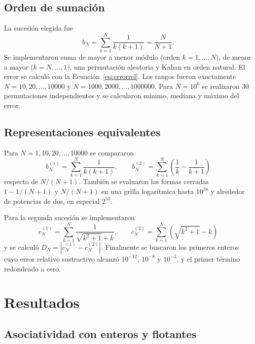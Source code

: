 \documentclass[11pt,a4paper]{article}
\newcommand{\Dabs}{D_N}
\begin{document}
\subsection{Orden de sumación}

La sucesión elegida fue
\begin{equation}
b_N=\sum_{k=1}^{N}\frac{1}{k(k+1)}=\frac{N}{N+1}.
\label{eq:bN}
\end{equation}
Se implementaron suma de mayor a menor módulo (orden $k=1,\ldots,N$), de menor a mayor ($k=N,\ldots,1$), una permutación aleatoria y Kahan en orden natural. El error se calculó con la Ecuación~\ref{eq:errorrel}. Los rangos fueron exactamente $N=10,20,\ldots,10000$ y $N=1000,2000,\ldots,1000000$. Para $N=10^6$ se realizaron 30 permutaciones independientes y se calcularon mínimo, mediana y máximo del error.

\subsection{Representaciones equivalentes}

Para $N=1,10,20,\ldots,10000$ se compararon
\begin{equation}
b_N^{(1)}=\sum_{k=1}^{N}\frac{1}{k(k+1)},
\qquad
b_N^{(2)}=\sum_{k=1}^{N}\left(\frac{1}{k}-\frac{1}{k+1}\right)
\label{eq:brep}
\end{equation}
respecto de $N/(N+1)$. También se evaluaron las formas cerradas $1-1/(N+1)$ y $N/(N+1)$ en una grilla logarítmica hasta $10^{18}$ y alrededor de potencias de dos, en especial $2^{53}$.

Para la segunda sucesión se implementaron
\begin{equation}
c_N^{(1)}=\sum_{k=1}^{N}\frac{1}{\sqrt{k^2+1}+k},
\qquad
c_N^{(2)}=\sum_{k=1}^{N}\left(\sqrt{k^2+1}-k\right)
\label{eq:crep}
\end{equation}
y se calculó $\Dabs=|c_N^{(1)}-c_N^{(2)}|$. Finalmente se buscaron los primeros enteros cuyo error relativo sustractivo alcanzó $10^{-12}$, $10^{-8}$ y $10^{-4}$, y el primer término redondeado a cero.

\section{Resultados}

\subsection{Asociatividad con enteros y flotantes}
\end{document}
